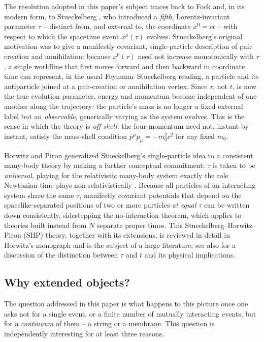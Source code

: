 \documentclass[11pt]{article}
\begin{document}
The resolution adopted in this paper's subject traces back to Fock
\cite{Fock1937} and, in its modern form, to Stueckelberg
\cite{Stueckelberg1941a,Stueckelberg1941b,Stueckelberg1942}, who introduced a
\emph{fifth}, Lorentz-invariant parameter $\tau$ -- distinct from, and external
to, the coordinate $x^0=ct$ -- with respect to which the spacetime event
$x^\mu(\tau)$ evolves. Stueckelberg's original motivation was to give a
manifestly covariant, single-particle description of pair creation and
annihilation: because $x^0(\tau)$ need not increase monotonically with $\tau$,
a single worldline that first moves forward and then backward in coordinate time
can represent, in the usual Feynman--Stueckelberg reading, a particle and its
antiparticle joined at a pair-creation or annihilation vertex. Since $\tau$, not
$t$, is now the true evolution parameter, energy and momentum become independent
of one another along the trajectory: the particle's mass is no longer a fixed
external label but an \emph{observable}, generically varying as the system
evolves. This is the sense in which the theory is \emph{off-shell}: the
four-momentum need not, instant by instant, satisfy the mass-shell condition
$p^\mu p_\mu=-m_0^2c^2$ for any fixed $m_0$.

Horwitz and Piron generalized Stueckelberg's single-particle idea to a
consistent many-body theory by making a further conceptual commitment: $\tau$ is
taken to be \emph{universal}, playing for the relativistic many-body system
exactly the role Newtonian time plays non-relativistically
\cite{HorwitzPiron1973}. Because all particles of an interacting system share
the same $\tau$, manifestly covariant potentials that depend on the
spacelike-separated positions of two or more particles \emph{at equal $\tau$}
can be written down consistently, sidestepping the no-interaction theorem, which
applies to theories built instead from $N$ separate proper times. This
Stueckelberg--Horwitz--Piron (SHP) theory, together with its extensions, is
reviewed in detail in Horwitz's monograph \cite{Horwitz2015} and is the subject
of a large literature; see also \cite{HorwitzArshanskyElitzur1988} for a
discussion of the distinction between $\tau$ and $t$ and its physical
implications.

\subsection{Why extended objects?}

The question addressed in this paper is what happens to this picture once one
asks not for a single event, or a finite number of mutually interacting events,
but for a \emph{continuum} of them -- a string or a membrane. This question is
independently interesting for at least three reasons.
\end{document}
